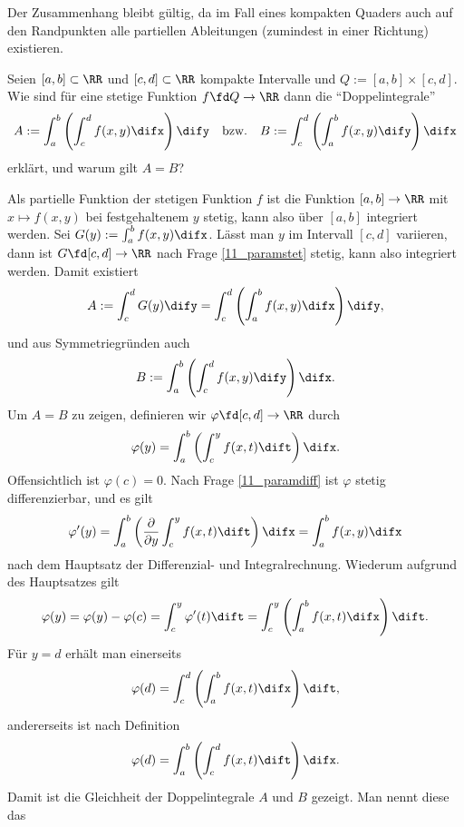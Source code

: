 \begin{antwort}
  Der Zusammenhang bleibt gültig, da im Fall eines kompakten 
  Quaders auch auf den Randpunkten alle partiellen Ableitungen 
  (zumindest in einer Richtung) existieren. 
  \AntEnd
\end{antwort} 

\begin{frage}\label{11_doppelint}
  Seien $[a,b]\subset \RR$ und $[c,d] \subset \RR$ kompakte Intervalle und 
  $Q := [a,b]\times [c,d]$. Wie sind für eine stetige Funktion 
  $f\fd Q\to \RR$ dann die "`Doppelintegrale"'
  \[
  A := \int_a^b \left( \int_c^d f(x,y) \difx \right) \dify \quad\text{bzw.}\quad
  B := \int_c^d \left( \int_a^b f(x,y) \dify \right) \difx
  \]
  erklärt, und warum gilt $A=B$?
\end{frage}

\begin{antwort}
  Als partielle Funktion der stetigen Funktion $f$ ist die Funktion 
  $[a,b]\to\RR$ mit $x\mapsto f(x,y)$ bei festgehaltenem $y$ stetig, kann 
  also über $[a,b]$ integriert werden. Sei 
  $G(y) := \int_a^b f(x,y)\difx$. Lässt man $y$ im Intervall $[c,d]$ variieren, 
  dann ist $G\fd [c,d]\to \RR$ nach Frage \ref{11_paramstet} stetig, kann 
  also integriert werden. Damit existiert 
  \[
  A := \int_c^d G(y) \dify = \int_c^d \left( \int_a^b f(x,y) \difx \right) \dify,
  \]
  und aus Symmetriegründen auch 
  \[
  B := \int_a^b \left( \int_c^d f(x,y) \dify \right) \difx.
  \]
  Um $A=B$ zu zeigen, definieren wir $\varphi \fd [c,d]\to\RR$ durch 
  \[
  \varphi(y) = \int_a^b \left( \int_c^y f(x,t) \dift \right) \difx. 
  \]
  Offensichtlich ist $\varphi(c)=0$. Nach Frage \ref{11_paramdiff} 
  ist $\varphi$ stetig differenzierbar, und es gilt
  \[
  \varphi'(y) = \int_a^b \left( 
    \frac{\partial}{\partial y} \int_c^y f(x,t) \dift \right) \difx 
  = \int_a^b f(x,y) \difx 
  \]
  nach dem Hauptsatz der Differenzial- und Integralrechnung. 
  Wiederum aufgrund des Hauptsatzes gilt
  \[
  \varphi(y)=\varphi(y)-\varphi(c) = 
  \int_c^y \varphi'(t) \dift = \int_c^y 
  \left( \int_a^b f(x,t) \difx \right)\dift.
  \]
  Für $y=d$ erhält man einerseits
  \[
  \varphi(d)=\int_c^d \left( \int_a^b f(x,t) \difx \right) \dift,
  \]
  andererseits ist nach Definition 
  \[
  \varphi(d)=\int_a^b \left( \int_c^d f(x,t) \dift \right) \difx.
  \]
  Damit ist die Gleichheit der Doppelintegrale $A$ und $B$ gezeigt. 
  Man nennt diese das 
  \AntEnd
\end{antwort}

